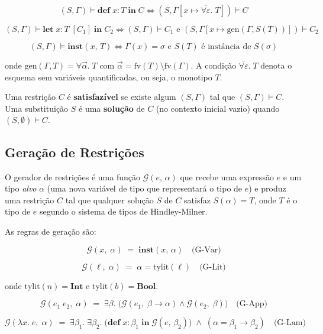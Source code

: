   \[ (S, \Gamma) \models \mathbf{def}\; x : T\; \mathbf{in}\; C \iff (S,
  \Gamma[x \mapsto \overline{\forall \varepsilon}.\; T]) \models C \]

  \[ (S, \Gamma) \models \mathbf{let}\; x : T\; [C_1]\; \mathbf{in}\; C_2
    \iff (S, \Gamma) \models C_1 \text{ e } (S, \Gamma[x \mapsto
  \mathrm{gen}(\Gamma, S(T))]) \models C_2 \]

  \[ (S, \Gamma) \models \mathbf{inst}(x,\, T) \iff \Gamma(x) = \sigma \text{ e
  } S(T) \text{ é instância de } S(\sigma) \]

  onde \(\mathrm{gen}(\Gamma, T) = \forall \vec{\alpha}.\; T\) com
  \(\vec{\alpha} = \mathrm{fv}(T) \setminus \mathrm{fv}(\Gamma)\). A
  condição \(\overline{\forall \varepsilon}.\; T\) denota o esquema sem
  variáveis quantificadas, ou seja, o monotipo \(T\).

  Uma restrição \(C\) é \textbf{satisfazível} se existe algum \((S,
  \Gamma)\) tal que \((S, \Gamma) \models C\). Uma substituição \(S\) é
  uma \textbf{solução} de \(C\) (no contexto inicial vazio) quando
  \((S, \emptyset) \models C\).

  \subsection{Geração de Restrições}

  O gerador de restrições é uma função \(\mathcal{G}(e,\, \alpha)\) que
  recebe uma expressão \(e\) e um tipo \emph{alvo} \(\alpha\) (uma
  nova variável de tipo que representará o tipo de \(e\)) e produz
  uma restrição \(C\) tal que qualquer solução \(S\) de \(C\) satisfaz
  \(S(\alpha) = T\), onde \(T\) é o tipo de \(e\) segundo o sistema de
  tipos de Hindley-Milner.

  As regras de geração são:

  \[ \mathcal{G}(x,\; \alpha) \;=\; \mathbf{inst}(x,\, \alpha)
  \quad\text{(G-Var)} \]

  \[ \mathcal{G}(\ell,\; \alpha) \;=\; \alpha = \mathrm{tylit}(\ell)
  \quad\text{(G-Lit)} \]

  onde \(\mathrm{tylit}(n) = \mathbf{Int}\) e
  \(\mathrm{tylit}(b) = \mathbf{Bool}\).

  \[ \mathcal{G}(e_1\; e_2,\; \alpha) \;=\; \exists
    \beta.\;\bigl(\mathcal{G}(e_1,\; \beta \to \alpha) \wedge \mathcal{G}(e_2,\;
  \beta)\bigr) \quad\text{(G-App)} \]

  \[ \mathcal{G}(\lambda x.\; e,\; \alpha) \;=\; \exists \beta_1.\; \exists
    \beta_2.\; \bigl(\mathbf{def}\; x : \beta_1\; \mathbf{in}\;
    \mathcal{G}(e,\, \beta_2)\bigr) \;\wedge\; (\alpha = \beta_1 \to \beta_2)
  \quad\text{(G-Lam)} \]

